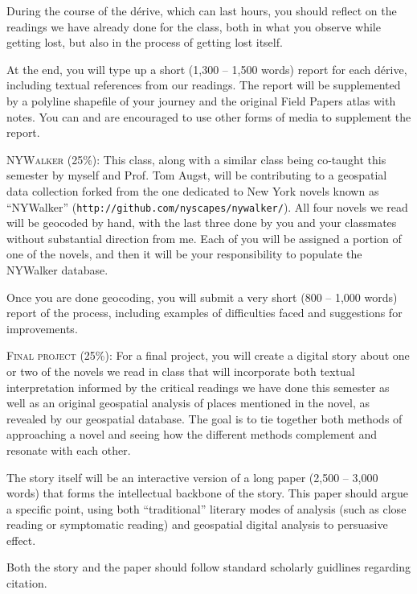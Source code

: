 \begin{description}
    During the course of the dérive, which can last hours, you should reflect
    on the readings we have already done for the class, both in what you
    observe while getting lost, but also in the process of getting lost itself.
    
    At the end, you will type up a short (1,300 -- 1,500 words) report for each
    dérive, including textual references from our readings. The report will be
    supplemented by a polyline shapefile of your journey and the original Field
    Papers atlas with notes. You can and are encouraged to use other forms of
    media to supplement the report.

  \item \textsc{NYWalker (25\%):} This class, along with a similar class being
    co-taught this semester by myself and Prof. Tom Augst, will be contributing
    to a geospatial data collection forked from the one dedicated to New York
    novels known as “NYWalker” (\texttt{http://github.com/nyscapes/nywalker/}).
    All four novels we read will be geocoded by hand, with the last three done
    by you and your classmates without substantial direction from me. Each of
    you will be assigned a portion of one of the novels, and then it will be
    your responsibility to populate the NYWalker database.

    Once you are done geocoding, you will submit a very short (800 -- 1,000
    words) report of the process, including examples of difficulties faced and
    suggestions for improvements.

  \item \textsc{Final project (25\%):} For a final project, you will create a
    digital story about one or two of the novels we read in class that will
    incorporate both textual interpretation informed by the critical readings
    we have done this semester as well as an original geospatial analysis of
    places mentioned in the novel, as revealed by our geospatial database. The
    goal is to tie together both methods of approaching a novel and seeing how
    the different methods complement and resonate with each other.

    The story itself will be an interactive version of a long paper (2,500 --
    3,000 words) that forms the intellectual backbone of the story. This paper
    should argue a specific point, using both “traditional” literary modes of
    analysis (such as close reading or symptomatic reading) and geospatial
    digital analysis to persuasive effect.

    Both the story and the paper should follow standard scholarly guidlines
    regarding citation.

\end{description}
